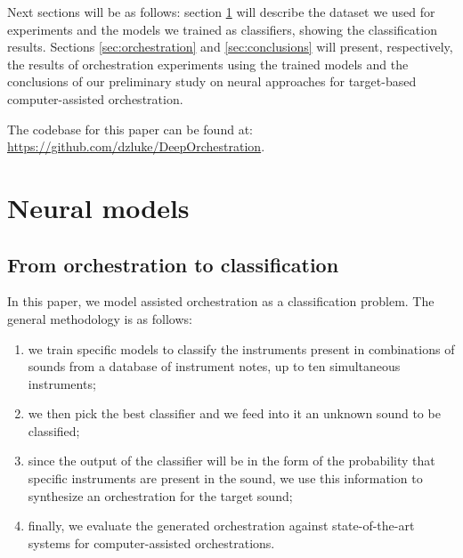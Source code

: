 \documentclass[runningheads,a4paper]{llncs}
\begin{document}
Next sections will be as follows: section \ref{sec:models} will describe the dataset we used for experiments and the models we trained as classifiers, showing the classification results. Sections \ref{sec:orchestration} and \ref{sec:conclusions} will present, respectively, the results of orchestration experiments using the trained models and the conclusions of our preliminary study on neural approaches for target-based computer-assisted orchestration.

The codebase for this paper can be found at: \url{https://github.com/dzluke/DeepOrchestration}.

\section{Neural models}
\label{sec:models}



\subsection{From orchestration to classification}

In this paper, we model assisted orchestration as a classification problem. The general methodology is as follows:
\begin{enumerate}
\item we train specific models to classify the instruments present in combinations of sounds from a database of instrument notes, up to ten simultaneous instruments;
\item we then pick the best classifier and we feed into it an unknown sound to be classified;
\item since the output of the classifier will be in the form of the probability that specific instruments are present in the sound, we use this information to synthesize an orchestration for the target sound;
\item finally, we evaluate the generated orchestration against state-of-the-art systems for computer-assisted orchestrations.
\end{enumerate}
\end{document}
